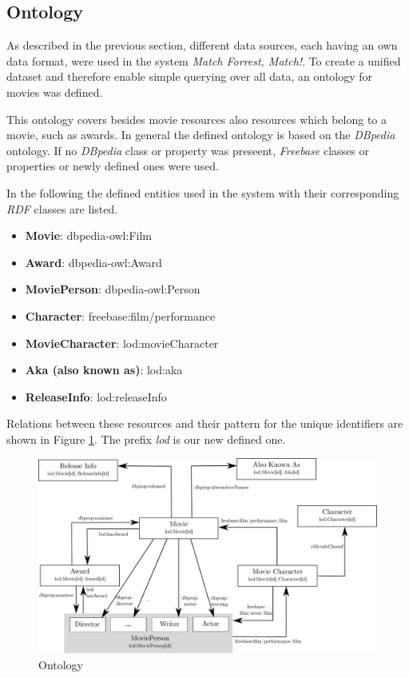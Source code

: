 \subsection{Ontology}
\label{subsec_method_ontology}

As described in the previous section, different data sources, each having an own data format, were used in the system \emph{Match Forrest, Match!}.
To create a unified dataset and therefore enable simple querying over all data, an ontology for movies was defined.

This ontology covers besides movie resources also resources which belong to a movie, such as awards.
In general the defined ontology is based on the \textit{DBpedia} ontology.
If no \textit{DBpedia} class or property was preseent, \textit{Freebase} classes or properties or newly defined ones were used.

In the following the defined entities used in the system with their corresponding \textit{RDF} classes are listed.
\begin{itemize}
	\item \textbf{Movie}: dbpedia-owl:Film
	\item \textbf{Award}: dbpedia-owl:Award
	\item \textbf{MoviePerson}: dbpedia-owl:Person
	\item \textbf{Character}: freebase:film/performance
	\item \textbf{MovieCharacter}: lod:movieCharacter
	\item \textbf{Aka (also known as)}: lod:aka
	\item \textbf{ReleaseInfo}: lod:releaseInfo
\end{itemize}
Relations between these resources and their pattern for the unique identifiers are shown in Figure \ref{fig_ontology}.
The prefix \textit{lod} is our new defined one.

\begin{figure}[h!]
\includegraphics[width=\textwidth]{images/ontology.pdf}
\caption{Ontology}
\label{fig_ontology}
\end{figure}

